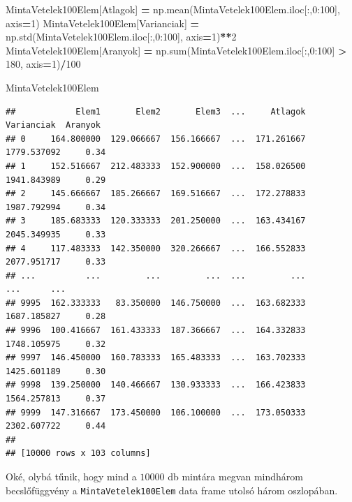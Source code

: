 \documentclass[
]{book}
\newenvironment{Shaded}{\begin{snugshade}}{\end{snugshade}}
\newcommand{\BuiltInTok}[1]{#1}
\newcommand{\DecValTok}[1]{\textcolor[rgb]{0.00,0.00,0.81}{#1}}
\newcommand{\NormalTok}[1]{#1}
\newcommand{\OperatorTok}[1]{\textcolor[rgb]{0.81,0.36,0.00}{\textbf{#1}}}
\newcommand{\StringTok}[1]{\textcolor[rgb]{0.31,0.60,0.02}{#1}}
\begin{document}
\begin{Shaded}
\begin{Highlighting}[]
\NormalTok{MintaVetelek100Elem[}\StringTok{\textquotesingle{}Atlagok\textquotesingle{}}\NormalTok{] }\OperatorTok{=}\NormalTok{ np.mean(MintaVetelek100Elem.iloc[:,}\DecValTok{0}\NormalTok{:}\DecValTok{100}\NormalTok{], axis}\OperatorTok{=}\DecValTok{1}\NormalTok{)}
\NormalTok{MintaVetelek100Elem[}\StringTok{\textquotesingle{}Varianciak\textquotesingle{}}\NormalTok{] }\OperatorTok{=}\NormalTok{ np.std(MintaVetelek100Elem.iloc[:,}\DecValTok{0}\NormalTok{:}\DecValTok{100}\NormalTok{], axis}\OperatorTok{=}\DecValTok{1}\NormalTok{)}\OperatorTok{**}\DecValTok{2}
\NormalTok{MintaVetelek100Elem[}\StringTok{\textquotesingle{}Aranyok\textquotesingle{}}\NormalTok{] }\OperatorTok{=}\NormalTok{ np.}\BuiltInTok{sum}\NormalTok{(MintaVetelek100Elem.iloc[:,}\DecValTok{0}\NormalTok{:}\DecValTok{100}\NormalTok{] }\OperatorTok{\textgreater{}} \DecValTok{180}\NormalTok{, axis}\OperatorTok{=}\DecValTok{1}\NormalTok{)}\OperatorTok{/}\DecValTok{100}

\NormalTok{MintaVetelek100Elem}
\end{Highlighting}
\end{Shaded}

\begin{verbatim}
##            Elem1       Elem2       Elem3  ...     Atlagok   Varianciak  Aranyok
## 0     164.800000  129.066667  156.166667  ...  171.261667  1779.537092     0.34
## 1     152.516667  212.483333  152.900000  ...  158.026500  1941.843989     0.29
## 2     145.666667  185.266667  169.516667  ...  172.278833  1987.792994     0.34
## 3     185.683333  120.333333  201.250000  ...  163.434167  2045.349935     0.33
## 4     117.483333  142.350000  320.266667  ...  166.552833  2077.951717     0.33
## ...          ...         ...         ...  ...         ...          ...      ...
## 9995  162.333333   83.350000  146.750000  ...  163.682333  1687.185827     0.28
## 9996  100.416667  161.433333  187.366667  ...  164.332833  1748.105975     0.32
## 9997  146.450000  160.783333  165.483333  ...  163.702333  1425.601189     0.30
## 9998  139.250000  140.466667  130.933333  ...  166.423833  1564.257813     0.37
## 9999  147.316667  173.450000  106.100000  ...  173.050333  2302.607722     0.44
## 
## [10000 rows x 103 columns]
\end{verbatim}

Oké, olybá tűnik, hogy mind a \(10000\) db mintára megvan mindhárom becslőfüggvény a \texttt{MintaVetelek100Elem} data frame utolsó három oszlopában.
\end{document}
